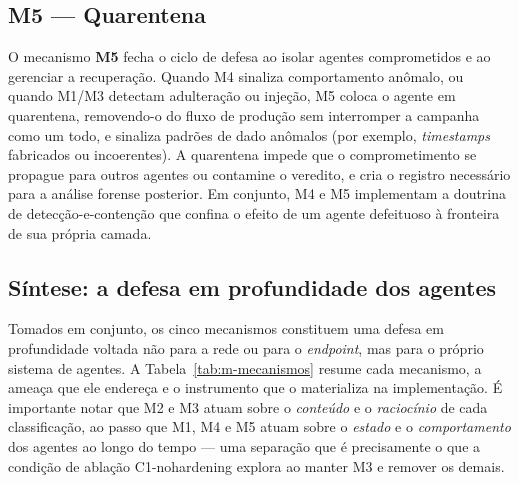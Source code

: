 \subsection{M5 --- Quarentena}
\label{sec:arq-m5}

O mecanismo \textbf{M5} fecha o ciclo de defesa ao isolar agentes comprometidos e
ao gerenciar a recuperação. Quando M4 sinaliza comportamento anômalo, ou quando
M1/M3 detectam adulteração ou injeção, M5 coloca o agente em quarentena,
removendo-o do fluxo de produção sem interromper a campanha como um todo, e
sinaliza padrões de dado anômalos (por exemplo, \emph{timestamps} fabricados ou
incoerentes). A quarentena impede que o comprometimento se propague para outros
agentes ou contamine o veredito, e cria o registro necessário para a análise
forense posterior. Em conjunto, M4 e M5 implementam a doutrina de
detecção-e-contenção que confina o efeito de um agente defeituoso à fronteira de
sua própria camada.

\subsection{Síntese: a defesa em profundidade dos agentes}
\label{sec:arq-defesa}

Tomados em conjunto, os cinco mecanismos constituem uma defesa em profundidade
voltada não para a rede ou para o \emph{endpoint}, mas para o próprio sistema de
agentes. A Tabela~\ref{tab:m-mecanismos} resume cada mecanismo, a ameaça que ele
endereça e o instrumento que o materializa na implementação. É importante notar
que M2 e M3 atuam sobre o \emph{conteúdo} e o \emph{raciocínio} de cada
classificação, ao passo que M1, M4 e M5 atuam sobre o \emph{estado} e o
\emph{comportamento} dos agentes ao longo do tempo — uma separação que é
precisamente o que a condição de ablação C1-nohardening explora ao manter M3 e
remover os demais.

